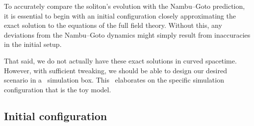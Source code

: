 



\newcommand{\epsA}{\ALIASepsA}
\newcommand{\epsB}{\ALIASepsB}
\newcommand{\epsC}{\ALIASepsC}
\newcommand{\hpAB}{\ALIAShpAB}
\newcommand{\hpA}{\ALIAShpA}
\newcommand{\hpB}{\ALIAShpB}
\newcommand{\hpC}{\ALIAShpC}





To accurately compare the soliton's evolution with the Nambu--Goto prediction, it is essential to begin with an initial configuration closely approximating the exact solution to the equations of the full field theory. Without this, any deviations from the Nambu--Goto dynamics might simply result from inaccuracies in the initial setup.

That said, we do not actually have these exact solutions in curved spacetime. %
However, with sufficient tweaking, we should be able to design our desired scenario in a~\gevolution{} simulation box.
This~ elaborates on the specific simulation configuration that is the toy model.





\subsection{Initial configuration}\label{sec:PT:gwas:initial_config}

